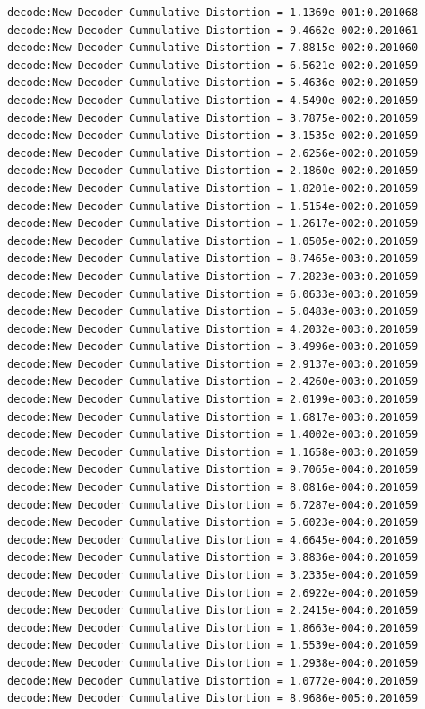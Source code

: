 \begin{verbatim}
decode:New Decoder Cummulative Distortion = 1.1369e-001:0.201068
decode:New Decoder Cummulative Distortion = 9.4662e-002:0.201061
decode:New Decoder Cummulative Distortion = 7.8815e-002:0.201060
decode:New Decoder Cummulative Distortion = 6.5621e-002:0.201059
decode:New Decoder Cummulative Distortion = 5.4636e-002:0.201059
decode:New Decoder Cummulative Distortion = 4.5490e-002:0.201059
decode:New Decoder Cummulative Distortion = 3.7875e-002:0.201059
decode:New Decoder Cummulative Distortion = 3.1535e-002:0.201059
decode:New Decoder Cummulative Distortion = 2.6256e-002:0.201059
decode:New Decoder Cummulative Distortion = 2.1860e-002:0.201059
decode:New Decoder Cummulative Distortion = 1.8201e-002:0.201059
decode:New Decoder Cummulative Distortion = 1.5154e-002:0.201059
decode:New Decoder Cummulative Distortion = 1.2617e-002:0.201059
decode:New Decoder Cummulative Distortion = 1.0505e-002:0.201059
decode:New Decoder Cummulative Distortion = 8.7465e-003:0.201059
decode:New Decoder Cummulative Distortion = 7.2823e-003:0.201059
decode:New Decoder Cummulative Distortion = 6.0633e-003:0.201059
decode:New Decoder Cummulative Distortion = 5.0483e-003:0.201059
decode:New Decoder Cummulative Distortion = 4.2032e-003:0.201059
decode:New Decoder Cummulative Distortion = 3.4996e-003:0.201059
decode:New Decoder Cummulative Distortion = 2.9137e-003:0.201059
decode:New Decoder Cummulative Distortion = 2.4260e-003:0.201059
decode:New Decoder Cummulative Distortion = 2.0199e-003:0.201059
decode:New Decoder Cummulative Distortion = 1.6817e-003:0.201059
decode:New Decoder Cummulative Distortion = 1.4002e-003:0.201059
decode:New Decoder Cummulative Distortion = 1.1658e-003:0.201059
decode:New Decoder Cummulative Distortion = 9.7065e-004:0.201059
decode:New Decoder Cummulative Distortion = 8.0816e-004:0.201059
decode:New Decoder Cummulative Distortion = 6.7287e-004:0.201059
decode:New Decoder Cummulative Distortion = 5.6023e-004:0.201059
decode:New Decoder Cummulative Distortion = 4.6645e-004:0.201059
decode:New Decoder Cummulative Distortion = 3.8836e-004:0.201059
decode:New Decoder Cummulative Distortion = 3.2335e-004:0.201059
decode:New Decoder Cummulative Distortion = 2.6922e-004:0.201059
decode:New Decoder Cummulative Distortion = 2.2415e-004:0.201059
decode:New Decoder Cummulative Distortion = 1.8663e-004:0.201059
decode:New Decoder Cummulative Distortion = 1.5539e-004:0.201059
decode:New Decoder Cummulative Distortion = 1.2938e-004:0.201059
decode:New Decoder Cummulative Distortion = 1.0772e-004:0.201059
decode:New Decoder Cummulative Distortion = 8.9686e-005:0.201059

\end{verbatim}
